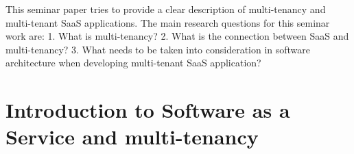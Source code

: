 \documentclass[conference]{sasmoota2017}
\begin{document}
This seminar paper tries to provide a clear description of multi-tenancy and multi-tenant SaaS applications. The main research questions for this seminar work are: 1. What is multi-tenancy? 2. What is the connection between SaaS and multi-tenancy? 3. What needs to be taken into consideration in software architecture when developing multi-tenant SaaS application? 


\section{Introduction to Software as a Service and multi-tenancy}

%
%
\end{document}
